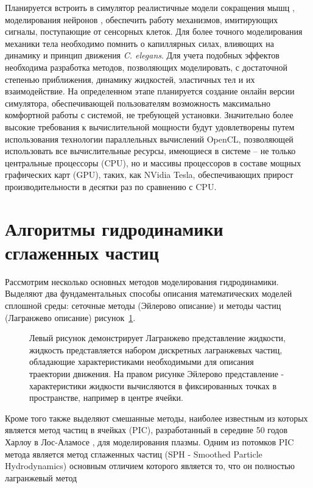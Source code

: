 Планируется встроить в симулятор реалистичные модели сокращения мышц \cite {Huxley1957MuscleSA}, моделирования нейронов \cite {Gleeson2010}, обеспечить работу механизмов, имитирующих сигналы, поступающие от сенсорных клеток. Для более точного моделирования механики тела необходимо помнить о капиллярных силах, влияющих на динамику и принцип движения \textit{C. elegans}. Для учета подобных эффектов необходима разработка методов, позволяющих моделировать, с достаточной степенью приближения, динамику жидкостей, эластичных тел и их взаимодействие. На определенном этапе планируется создание онлайн версии симулятора, обеспечивающей пользователям возможность максимально комфортной работы с системой, не требующей установки. Значительно более высокие требования к вычислительной мощности будут удовлетворены путем использования технологии параллельных вычислений OpenCL, позволяющей использовать все вычислительные ресурсы, имеющиеся в системе – не только центральные процессоры (CPU), но и массивы процессоров в составе мощных графических карт (GPU), таких, как NVidia Tesla, обеспечивающих прирост производительности в десятки раз по сравнению с CPU.

\section{Алгоритмы гидродинамики сглаженных частиц}\label{sec:ch1/sec3}

Рассмотрим несколько основных методов моделирования гидродинамики. Выделяют два фундаментальных способы описания математических моделей сплошной среды: сеточные методы (Эйлерово описание) и методы частиц  (Лагранжево описание) рисунок~\ref{fig:sim_class}.

\begin{figure}[ht]
  \caption{Левый рисунок демонстрирует Лагранжево представление жидкости, жидкость представляется набором дискретных лагранжевых частиц, обладающие характеристиками необходимыми для описания траектории движения. На правом рисунке Эйлерово представление - характеристики жидкости вычисляются в фиксированных точках в пространстве, например в центре ячейки.}\label{fig:sim_class}
\end{figure}

Кроме того также выделяют смешанные методы, наиболее известным из которых является метод частиц в ячейках (PIC), разработанный в середине 50 годов Харлоу в Лос-Аламосе \cite {Harlow1963, Belocherkovsky1982, Grigoriev2000}, для моделирования плазмы. Одним из потомков PIC метода является метод сглаженных частиц (SPH - Smoothed Particle Hydrodynamics) основным отличием которого является то, что он полностью лагранжевый метод \cite{Gingold1977, Lucy1977}

